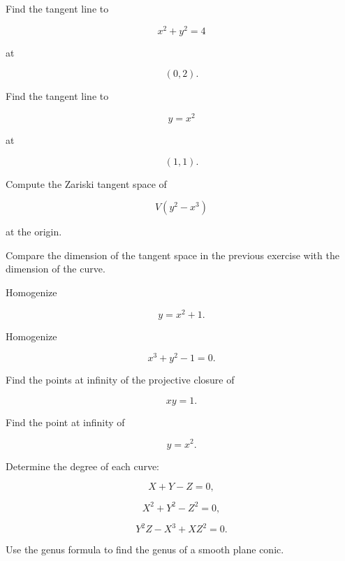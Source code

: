 \begin{exercise}[2]
Find the tangent line to

\[
x^2+y^2=4
\]

at

\[
(0,2).
\]
\end{exercise}

\begin{exercise}[2]
Find the tangent line to

\[
y=x^2
\]

at

\[
(1,1).
\]
\end{exercise}

\begin{exercise}[3]
Compute the Zariski tangent space of

\[
V(y^2-x^3)
\]

at the origin.
\end{exercise}

\begin{exercise}[3]
Compare the dimension of the tangent space in the previous exercise with the
dimension of the curve.
\end{exercise}

\begin{exercise}[2]
Homogenize

\[
y=x^2+1.
\]
\end{exercise}

\begin{exercise}[2]
Homogenize

\[
x^3+y^2-1=0.
\]
\end{exercise}

\begin{exercise}[2]
Find the points at infinity of the projective closure of

\[
xy=1.
\]
\end{exercise}

\begin{exercise}[2]
Find the point at infinity of

\[
y=x^2.
\]
\end{exercise}

\begin{exercise}[2]
Determine the degree of each curve:

\[
X+Y-Z=0,
\]

\[
X^2+Y^2-Z^2=0,
\]

\[
Y^2Z-X^3+XZ^2=0.
\]
\end{exercise}

\begin{exercise}[2]
Use the genus formula to find the genus of a smooth plane conic.
\end{exercise}

